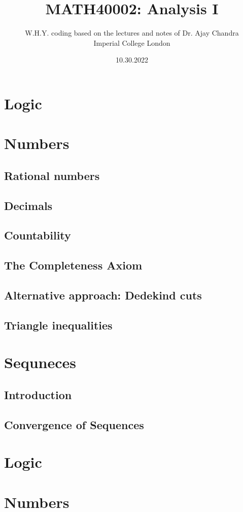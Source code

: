 \documentclass[a4paper]{article}
\title{MATH40002: Analysis I}
\author{W.H.Y. coding based on the lectures and notes of Dr. Ajay Chandra\\
Imperial College London}
\date{10.30.2022}
\begin{document}
\maketitle
\newpage
\setcounter{tocdepth}{3}
\tableofcontents
\section{Logic}
\section{Numbers}
\subsection{Rational numbers}
\subsection{Decimals}
\subsection{Countability}
\subsection{The Completeness Axiom} 
\subsection{Alternative approach: Dedekind cuts}
\subsection{Triangle inequalities}
\section{Sequneces}
\subsection{Introduction}
\subsection{Convergence of Sequences}
\setcounter{section}{0}
\newpage
\section{Logic}
\newpage
\section{Numbers}
\end{document}
